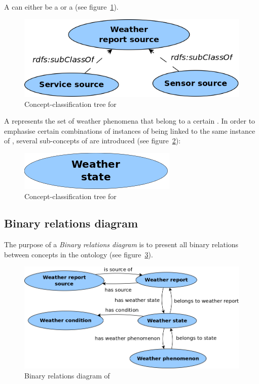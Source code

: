A  can either be a  or a  (see figure~\ref{fig:tree_weather_source}).

\begin{figure}
  \centering
  \includegraphics[width=.5\textwidth]{figures/diagrams/weather-report-source.png}
  \caption{Concept-classification tree for }
  \label{fig:tree_weather_source}
\end{figure}

A  represents the set of weather phenomena that belong to a certain . In order to emphasise certain combinations of instances of  being linked to the same instance of , several sub-concepts of  are introduced (see figure~\ref{fig:tree_weather_state}): %

\begin{figure}
  \centering
  \includegraphics[width=.3\textwidth]{figures/diagrams/weather-state.png}
  \caption{Concept-classification tree for }
  \label{fig:tree_weather_state}
\end{figure}

\subsection{Binary relations diagram}
\label{subsec:binary_relations_diagram}

The purpose of a \emph{Binary relations diagram} is to present all binary relations between concepts in the ontology (see figure~\ref{fig:binary_relations}).

\begin{figure}
  \centering
  \includegraphics[width=.8\textwidth]{figures/diagrams/binary-relations.png}
  \caption{Binary relations diagram of \thinkhomeweather}
  \label{fig:binary_relations}
\end{figure}

